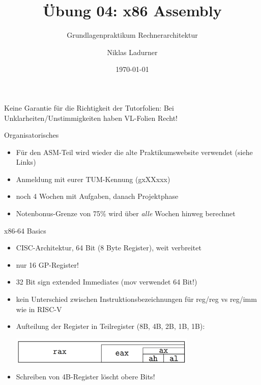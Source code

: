 \documentclass[
  german,            %
  aspectratio=169,    %
]{tumbeamer}
\title{Übung 04: x86 Assembly}
\subtitle{Grundlagenpraktikum Rechnerarchitektur}
\author{Niklas Ladurner}
\institute{\theChairName\\\theDepartmentName\\\theUniversityName}
\date[\today]{\today}
\begin{document}
\maketitle

\begin{frame}[c]{}{}
  \begin{center}
    \LARGE  Keine Garantie für die Richtigkeit der Tutorfolien: Bei Unklarheiten/Unstimmigkeiten
    haben VL-Folien Recht!
  \end{center}
\end{frame}

\begin{frame}[c, fragile]{Organisatorisches}{}
  \begin{itemize}
    \item Für den ASM-Teil wird wieder die alte Praktikumswebsite verwendet (siehe Links)
    \item Anmeldung mit eurer TUM-Kennung (gxXXxxx)
    \item noch 4 Wochen mit Aufgaben, danach Projektphase
    \item Notenbonus-Grenze von 75\% wird über \textit{alle} Wochen hinweg berechnet
  \end{itemize}
\end{frame}

\begin{frame}[c, fragile]{x86-64 Basics}{}
  \begin{itemize}
    \item CISC-Architektur, 64 Bit (8 Byte Register), weit verbreitet
    \item nur 16 GP-Register!
    \item 32 Bit sign extended Immediates (mov verwendet 64 Bit!)
    \item kein Unterschied zwischen Instruktionsbezeichnungen für reg/reg vs reg/imm wie in RISC-V
    \item Aufteilung der Register in Teilregister (8B, 4B, 2B, 1B, 1B):
          \begin{center}
            \includegraphics[width=0.7\textwidth]{w04_reg_div.png}
          \end{center}
    \item Schreiben von 4B-Register löscht obere Bits!
  \end{itemize}
\end{frame}
\end{document}
